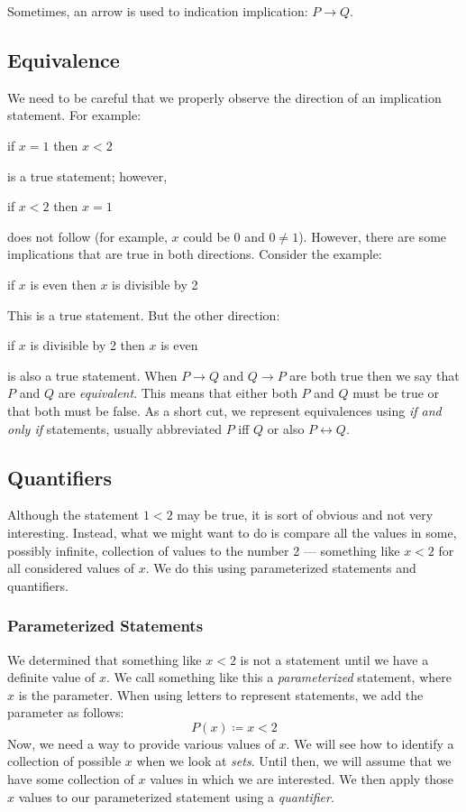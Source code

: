 \documentclass[letterpaper,12pt,fleqn]{article}
\begin{document}
Sometimes, an arrow is used to indication implication: $P\rightarrow Q$.

\subsection*{Equivalence}

We need to be careful that we properly observe the direction of an implication
statement.  For example:

\hspace{0.5in}if $x=1$ then $x<2$

is a true statement; however,

\hspace{0.5in}if $x<2$ then $x=1$

does not follow (for example, $x$ could be 0 and $0\ne1$). However, there are
some implications that are true in both directions. Consider the example:

\hspace{0.5in}if $x$ is even then $x$ is divisible by 2

This is a true statement. But the other direction:

\hspace{0.5in}if $x$ is divisible by 2 then $x$ is even

is also a true statement. When $P\rightarrow Q$ and $Q\rightarrow P$ are both
true then we say that $P$ and $Q$ are \emph{equivalent}. This means that either
both $P$ and $Q$ must be true or that both must be false. As a short cut, we
represent equivalences using \emph{if and only if} statements, usually
abbreviated $P$ iff $Q$ or also $P\leftrightarrow Q$.

\subsection*{Quantifiers}

Although the statement $1<2$ may be true, it is sort of obvious and not very
interesting. Instead, what we might want to do is compare all the values in
some, possibly infinite, collection of values to the number 2 --- something
like $x<2$ for all considered values of $x$. We do this using parameterized
statements and quantifiers.

\subsubsection*{Parameterized Statements}

We determined that something like $x<2$ is not a statement until we have a
definite value of $x$. We call something like this a \emph{parameterized}
statement, where $x$ is the parameter. When using letters to represent
statements, we add the parameter as follows:
\[P(x)\coloneqq x<2\]
Now, we need a way to provide various values of $x$. We will see how to
identify a collection of possible $x$ when we look at \emph{sets}. Until then,
we will assume that we have some collection of $x$ values in which we are
interested. We then apply those $x$ values to our parameterized statement using
a \emph{quantifier}.
\end{document}
